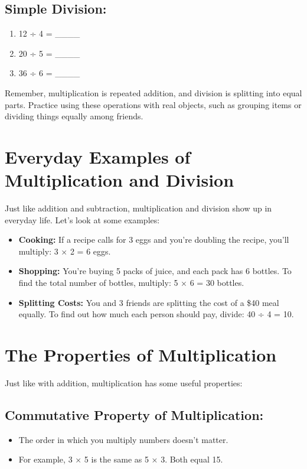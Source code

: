 \subsection{Simple Division:}
\begin{enumerate}
    \item 12 ÷ 4 = \_\_\_\_
    \item 20 ÷ 5 = \_\_\_\_
    \item 36 ÷ 6 = \_\_\_\_
\end{enumerate}

Remember, multiplication is repeated addition, and division is splitting into equal parts. Practice using these operations with real objects, such as grouping items or dividing things equally among friends.

\section{Everyday Examples of Multiplication and Division}
Just like addition and subtraction, multiplication and division show up in everyday life. Let’s look at some examples:
\begin{itemize}
    \item \textbf{Cooking:} If a recipe calls for 3 eggs and you’re doubling the recipe, you’ll multiply: 3 × 2 = 6 eggs.
    \item \textbf{Shopping:} You’re buying 5 packs of juice, and each pack has 6 bottles. To find the total number of bottles, multiply: 5 × 6 = 30 bottles.
    \item \textbf{Splitting Costs:} You and 3 friends are splitting the cost of a \$40 meal equally. To find out how much each person should pay, divide: 40 ÷ 4 = 10.
\end{itemize}

\section{The Properties of Multiplication}
Just like with addition, multiplication has some useful properties:

\subsection{Commutative Property of Multiplication:}
\begin{itemize}
    \item The order in which you multiply numbers doesn’t matter.
    \item For example, 3 × 5 is the same as 5 × 3. Both equal 15.
\end{itemize}

